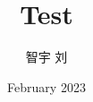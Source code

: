


% 







% 

\documentclass{article}
\usepackage{graphicx} %
\usepackage[UTF8]{ctex}
\usepackage{lipsum}
% 


\title{Test}
\author{智宇 刘}
\date{February 2023}



    \maketitle

    \tableofcontents

\section{Introduction}

